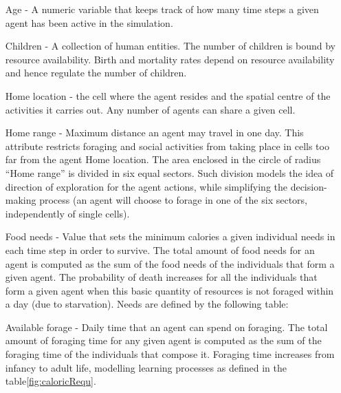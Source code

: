 \documentclass[11pt,oneside,a4paper,openright]{report}
\begin{document}
\begin{enumerate}
\renewcommand{\labelitemi}{$\bullet$}
\renewcommand{\labelitemii}{$\cdot$}

\item[Age] - A numeric variable that keeps track of how many time steps a given agent has been
active in the simulation.
\item[Children] - A collection of human entities. The number of children is bound by resource
availability. Birth and mortality rates depend on resource availability and hence regulate the 
number of children.
\item[Home location] - the cell where the agent resides and the spatial centre of the activities it
carries out. Any number of agents can share a given cell.
\item[Home range] - Maximum distance an agent may travel in one day. This attribute restricts
foraging and social activities from taking place in cells too far from the agent Home location.
The area enclosed in the circle of radius “Home range” is divided in six equal sectors. Such
division models the idea of direction of exploration for the agent actions, while simplifying the
decision-making process (an agent will choose to forage in one of the six sectors,
independently of single cells).
\item[Food needs] - Value that sets the minimum calories a given individual needs in each time step
in order to survive. The total amount of food needs for an agent is computed as the sum of the
food needs of the individuals that form a given agent. The probability of death increases for all
the individuals that form a given agent when this basic quantity of resources is not foraged
within a day (due to starvation). Needs are defined by the following table:
\item[Available forage] - Daily time that an agent can spend on foraging. The total amount of
foraging time for any given agent is computed as the sum of the foraging time of the
individuals that compose it. Foraging time increases from infancy to adult life, modelling
learning processes as defined in the table\ref{fig:caloricRequ}.


\end{enumerate}


 
\end{document}
